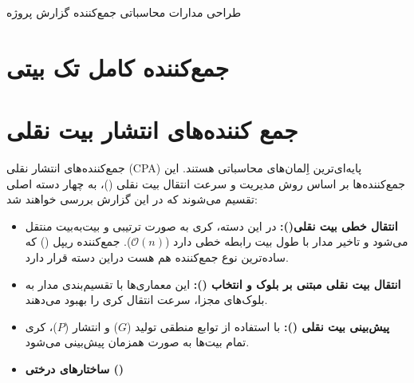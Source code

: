 \documentclass[10pt,a4paper, twoside]{article}
\begin{document}
\setcounter{tocdepth}{4}

\setassignmenttitle
{
    طراحی مدارات محاسباتی جمع‌کننده
}
{
    گزارش پروژه
}

\makecoverpage
\newpage
\tableofcontents
\newpage



\section{جمع‌کننده کامل تک بیتی}

\newpage


\section{جمع کننده‌های انتشار بیت نقلی }

جمع‌کننده‌های انتشار نقلی (CPA) پایه‌ای‌ترین اِلمان‌های محاسباتی هستند. این جمع‌کننده‌ها بر اساس روش مدیریت و سرعت انتقال بیت نقلی ()،
به چهار دسته اصلی تقسیم می‌شوند که در این گزارش بررسی خواهند شد:

\begin{itemize}
    \item \textbf{انتقال خطی بیت‌ نقلی():} در این دسته، کری به صورت ترتیبی و بیت‌به‌بیت منتقل می‌شود و تاخیر مدار با طول بیت رابطه خطی دارد ($\mathcal{O}(n)$).
     جمع‌کننده ریپل () که ساده‌ترین نوع جمع‌کننده هم هست دراین دسته قرار دارد.

    \item \textbf{ انتقال بیت نقلی مبتنی بر بلوک و انتخاب ():} این معماری‌ها با تقسیم‌بندی مدار به بلوک‌های مجزا، سرعت انتقال کری را بهبود می‌دهند.
    \item \textbf{پیش‌بینی بیت نقلی ():} با استفاده از توابع منطقی تولید ($G$) و انتشار ($P$)، کری تمام بیت‌ها به صورت همزمان پیش‌بینی می‌شود.
    \item \textbf{ساختار‌های درختی ()}
\end{itemize}
\end{document}
